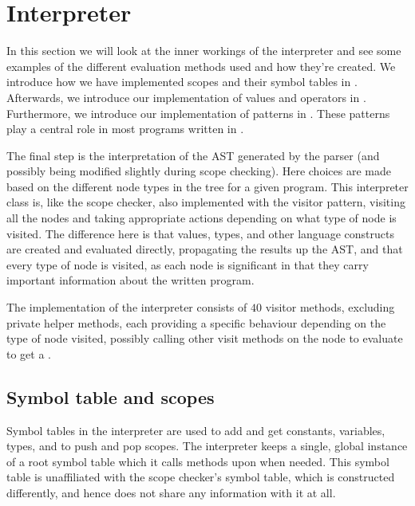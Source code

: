 \section{Interpreter}
\label{sec:interpreter}

In this section we will look at the inner workings of the interpreter
and see some examples of the different evaluation methods used and how
they're created. We introduce how we have implemented scopes and their symbol
tables in . Afterwards, we introduce our
implementation of values and operators in .
Furthermore, we introduce our implementation of patterns in 
. These patterns play a central role in most programs 
written in \productname{}.

The final step is the interpretation of the AST generated by the parser
(and possibly being modified slightly during scope checking). Here
choices are made based on the different node types in the tree for a
given program. This interpreter class is, like the scope checker, also
implemented with the visitor pattern, visiting all the nodes and taking
appropriate actions depending on what type of node is visited. The
difference here is that values, types, and other language constructs are
created and evaluated directly, propagating the results up the AST, and
that every type of node is visited, as each node is significant in that
they carry important information about the written program.

The implementation of the interpreter consists of $40$ visitor methods,
excluding private helper methods, each providing a specific behaviour
depending on the type of node visited, possibly calling other visit
methods on the node to evaluate to get a .


\subsection{Symbol table and scopes}
\label{sec:symboltableandscopes}
Symbol tables in the interpreter are used to add and get constants,
variables, types, and to push and pop scopes. The interpreter keeps a
single, global instance of a root symbol table which it calls methods
upon when needed. This symbol table is unaffiliated with the scope
checker's symbol table, which is constructed differently, and hence does
not share any information with it at all.

